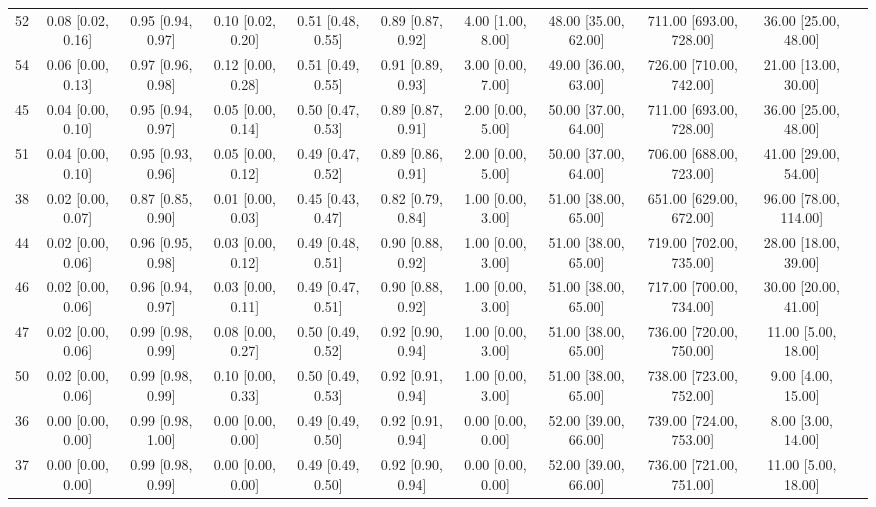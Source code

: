 \documentclass[8pt]{article}
\begin{document}
\begin{center}
\begin{footnotesize}
\begin{longtable}{|ccccccccccc|}
 52 &  0.08 [0.02, 0.16] &  0.95 [0.94, 0.97] &  0.10 [0.02, 0.20] &  0.51 [0.48, 0.55] &  0.89 [0.87, 0.92] &     4.00 [1.00, 8.00] &  48.00 [35.00, 62.00] &  711.00 [693.00, 728.00] &     36.00 [25.00, 48.00] \\
 54 &  0.06 [0.00, 0.13] &  0.97 [0.96, 0.98] &  0.12 [0.00, 0.28] &  0.51 [0.49, 0.55] &  0.91 [0.89, 0.93] &     3.00 [0.00, 7.00] &  49.00 [36.00, 63.00] &  726.00 [710.00, 742.00] &     21.00 [13.00, 30.00] \\
 45 &  0.04 [0.00, 0.10] &  0.95 [0.94, 0.97] &  0.05 [0.00, 0.14] &  0.50 [0.47, 0.53] &  0.89 [0.87, 0.91] &     2.00 [0.00, 5.00] &  50.00 [37.00, 64.00] &  711.00 [693.00, 728.00] &     36.00 [25.00, 48.00] \\
 51 &  0.04 [0.00, 0.10] &  0.95 [0.93, 0.96] &  0.05 [0.00, 0.12] &  0.49 [0.47, 0.52] &  0.89 [0.86, 0.91] &     2.00 [0.00, 5.00] &  50.00 [37.00, 64.00] &  706.00 [688.00, 723.00] &     41.00 [29.00, 54.00] \\
 38 &  0.02 [0.00, 0.07] &  0.87 [0.85, 0.90] &  0.01 [0.00, 0.03] &  0.45 [0.43, 0.47] &  0.82 [0.79, 0.84] &     1.00 [0.00, 3.00] &  51.00 [38.00, 65.00] &  651.00 [629.00, 672.00] &    96.00 [78.00, 114.00] \\
 44 &  0.02 [0.00, 0.06] &  0.96 [0.95, 0.98] &  0.03 [0.00, 0.12] &  0.49 [0.48, 0.51] &  0.90 [0.88, 0.92] &     1.00 [0.00, 3.00] &  51.00 [38.00, 65.00] &  719.00 [702.00, 735.00] &     28.00 [18.00, 39.00] \\
 46 &  0.02 [0.00, 0.06] &  0.96 [0.94, 0.97] &  0.03 [0.00, 0.11] &  0.49 [0.47, 0.51] &  0.90 [0.88, 0.92] &     1.00 [0.00, 3.00] &  51.00 [38.00, 65.00] &  717.00 [700.00, 734.00] &     30.00 [20.00, 41.00] \\
 47 &  0.02 [0.00, 0.06] &  0.99 [0.98, 0.99] &  0.08 [0.00, 0.27] &  0.50 [0.49, 0.52] &  0.92 [0.90, 0.94] &     1.00 [0.00, 3.00] &  51.00 [38.00, 65.00] &  736.00 [720.00, 750.00] &      11.00 [5.00, 18.00] \\
 50 &  0.02 [0.00, 0.06] &  0.99 [0.98, 0.99] &  0.10 [0.00, 0.33] &  0.50 [0.49, 0.53] &  0.92 [0.91, 0.94] &     1.00 [0.00, 3.00] &  51.00 [38.00, 65.00] &  738.00 [723.00, 752.00] &       9.00 [4.00, 15.00] \\
 36 &  0.00 [0.00, 0.00] &  0.99 [0.98, 1.00] &  0.00 [0.00, 0.00] &  0.49 [0.49, 0.50] &  0.92 [0.91, 0.94] &     0.00 [0.00, 0.00] &  52.00 [39.00, 66.00] &  739.00 [724.00, 753.00] &       8.00 [3.00, 14.00] \\
 37 &  0.00 [0.00, 0.00] &  0.99 [0.98, 0.99] &  0.00 [0.00, 0.00] &  0.49 [0.49, 0.50] &  0.92 [0.90, 0.94] &     0.00 [0.00, 0.00] &  52.00 [39.00, 66.00] &  736.00 [721.00, 751.00] &      11.00 [5.00, 18.00] \\

\end{longtable}
\end{footnotesize}
\end{center}
\end{document}
